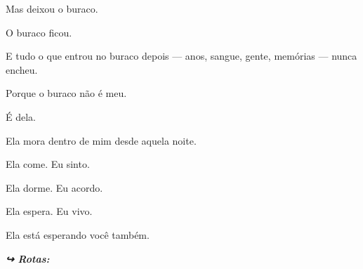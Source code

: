 \noindent Mas deixou o buraco.

\noindent O buraco ficou.

\noindent E tudo o que entrou no buraco depois --- anos, sangue, gente, memórias --- nunca encheu.

\noindent Porque o buraco não é meu.

\noindent É dela.

\noindent Ela mora dentro de mim desde aquela noite.

\noindent Ela come. Eu sinto.

\noindent Ela dorme. Eu acordo.

\noindent Ela espera. Eu vivo.

\noindent Ela está esperando você também.

\vspace{0.5em}
\noindent\textit{\textbf{↪ Rotas:}  \rotasep {} \rotasep {}}